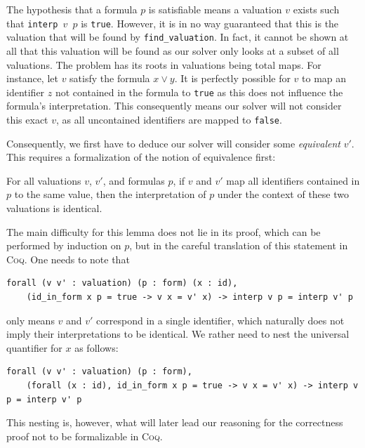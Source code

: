 The hypothesis that a formula $p$ is satisfiable means a valuation $v$ exists such that \texttt{interp $v$ $p$} is \texttt{true}.
However, it is in no way guaranteed that this is the valuation that will be found by \texttt{find\_valuation}.
In fact, it cannot be shown at all that this valuation will be found as our solver only looks at a subset of all valuations.
The problem has its roots in valuations being total maps.
For instance, let $v$ satisfy the formula $x \lor y$.
It is perfectly possible for $v$ to map an identifier $z$ not contained in the formula to \texttt{true} as this does not influence the formula's interpretation.
This consequently means our solver will not consider this exact $v$, as all uncontained identifiers are mapped to \texttt{false}.

Consequently, we first have to deduce our solver will consider some \emph{equivalent} $v'$.
This requires a formalization of the notion of equivalence first:
\begin{lemma}\label{lem:interp_eq}
    For all valuations $v$, $v'$, and formulas $p$, if $v$ and $v'$ map all identifiers contained in $p$ to the same value, then the interpretation of $p$ under the context of these two valuations is identical.
\end{lemma}
The main difficulty for this lemma does not lie in its proof, which can be performed by induction on $p$, but in the careful translation of this statement in \textsc{Coq}.
One needs to note that
\begin{lstlisting}[language=coq]
forall (v v' : valuation) (p : form) (x : id),
    (id_in_form x p = true -> v x = v' x) -> interp v p = interp v' p
\end{lstlisting}
only means $v$ and $v'$ correspond in a single identifier, which naturally does not imply their interpretations to be identical.
We rather need to nest the universal quantifier for $x$ as follows:
\begin{lstlisting}[language=coq]
forall (v v' : valuation) (p : form),
    (forall (x : id), id_in_form x p = true -> v x = v' x) -> interp v p = interp v' p
\end{lstlisting}
This nesting is, however, what will later lead our reasoning for the correctness proof not to be formalizable in \textsc{Coq}.

